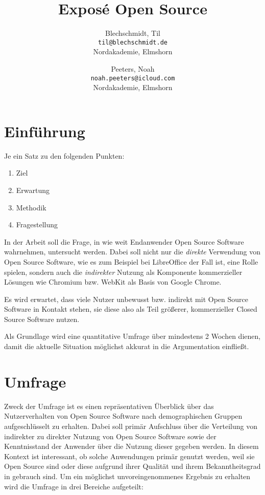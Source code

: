 \documentclass[a4paper]{article}
\title{Exposé Open Source}
\author{
  Blechschmidt, Til\\
  \texttt{til@blechschmidt.de}\\
  Nordakademie, Elmshorn
  \and
  Peeters, Noah\\
  \texttt{noah.peeters@icloud.com}\\
  Nordakademie, Elmshorn
}
\begin{document}
	\maketitle
	
	\section{Einführung}
	   Je ein Satz zu den folgenden Punkten:
	   \begin{enumerate}
	       \item Ziel
	       \item Erwartung
	       \item Methodik
	       \item Fragestellung
	   \end{enumerate}
	
	   In der Arbeit soll die Frage, in wie weit Endanwender Open Source Software wahrnehmen, untersucht werden. Dabei soll nicht nur die \emph{direkte} Verwendung von Open Source Software, wie es zum Beispiel bei LibreOffice der Fall ist, eine Rolle spielen, sondern auch die \emph{indirekter} Nutzung als Komponente kommerzieller Lösungen wie Chromium bzw. WebKit als Basis von Google Chrome.
	   
	   Es wird erwartet, dass viele Nutzer unbewusst bzw. indirekt mit Open Source Software in Kontakt stehen, sie diese also als Teil größerer, kommerzieller Closed Source Software nutzen.
	   
	   Als Grundlage wird eine quantitative Umfrage über mindestens 2 Wochen dienen, damit die aktuelle Situation möglichst akkurat in die Argumentation einfließt.
	
	\section{Umfrage}
		Zweck der Umfrage ist es einen repräsentativen Überblick über das Nutzerverhalten von Open Source Software nach demographischen Gruppen aufgeschlüsselt zu erhalten. Dabei soll primär Aufschluss über die Verteilung von indirekter zu direkter Nutzung von Open Source Software sowie der Kenntnisstand der Anwender über die Nutzung dieser gegeben werden. In diesem Kontext ist interessant, ob solche Anwendungen primär genutzt werden, weil sie Open Source sind oder diese aufgrund ihrer Qualität und ihrem Bekanntheitsgrad in gebrauch sind.
		Um ein möglichst unvoreingenommenes Ergebnis zu erhalten wird die Umfrage in drei Bereiche aufgeteilt:
	   
\end{document}
